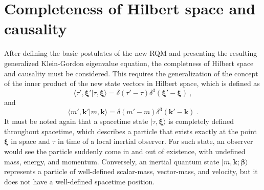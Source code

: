 \documentclass[12pt]{iopart}
\begin{document}
\section{Completeness of Hilbert space and causality}

After defining the basic postulates of the new RQM and presenting the resulting generalized 
Klein-Gordon eigenvalue equation, the completness of Hilbert space and causality must be 
considered.  This requires the generalization of the concept of the inner product of the new 
state vectors in Hilbert space, which is defined as
%
    \begin{equation}
        \langle\tau',\boldsymbol{\xi}'\vert\tau,\boldsymbol{\xi}
        \rangle = \delta(\tau'-\tau)\delta^3\left(\boldsymbol{\xi}'-
        \boldsymbol{\xi}\right)\ ,
        \label{S5eq1}
    \end{equation}
%
and
%
    \begin{equation}
        \langle m',\boldsymbol{k}'\vert m,\boldsymbol{k}
        \rangle = \delta(m'-m)\delta^3\left(\boldsymbol{k}'
        -\boldsymbol{k}\right)\ .
        \label{S5eq2}
    \end{equation}
%
It must be noted again that a spacetime state $\vert\tau,\boldsymbol{\xi}\rangle$ 
is completely defined throughout spacetime, which describes a particle that exists 
exactly at the point $\boldsymbol{\xi}$ in space and $\tau$ in time of a local inertial 
observer.  For such state, an observer would see the particle suddenly come in and 
out of existence, with undefined mass, energy, and momentum.   Conversely, an 
inertial quantum state $\vert m,\boldsymbol{k};\boldsymbol{\beta}\rangle$ 
represents a particle of well-defined scalar-mass, vector-mass, and velocity, but it 
does not have a well-defined spacetime position.
\end{document}
